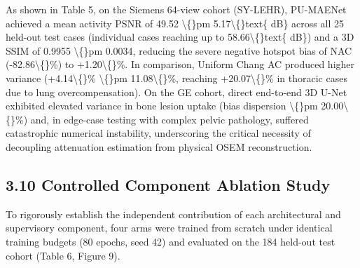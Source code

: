\documentclass[11pt]{article}
\begin{document}
As shown in Table 5, on the Siemens 64-view cohort (SY-LEHR), PU-MAENet achieved a mean activity PSNR of 49.52 \textbackslash\{\}pm 5.17\textbackslash\{\}text\{ dB\} across all 25 held-out test cases (individual cases reaching up to 58.66\textbackslash\{\}text\{ dB\}) and a 3D SSIM of 0.9955 \textbackslash\{\}pm 0.0034, reducing the severe negative hotspot bias of NAC (-82.86\textbackslash\{\}\%) to +1.20\textbackslash\{\}\%. In comparison, Uniform Chang AC produced higher variance (+4.14\textbackslash\{\}\% \textbackslash\{\}pm 11.08\textbackslash\{\}\%, reaching +20.07\textbackslash\{\}\% in thoracic cases due to lung overcompensation). On the GE cohort, direct end-to-end 3D U-Net exhibited elevated variance in bone lesion uptake (bias dispersion \textbackslash\{\}pm 20.00\textbackslash\{\}\%) and, in edge-case testing with complex pelvic pathology, suffered catastrophic numerical instability, underscoring the critical necessity of decoupling attenuation estimation from physical OSEM reconstruction.\par

\subsection*{3.10 Controlled Component Ablation Study}
To rigorously establish the independent contribution of each architectural and supervisory component, four arms were trained from scratch under identical training budgets (80 epochs, seed 42) and evaluated on the 184 held-out test cohort (Table 6, Figure 9).\par
\end{document}
